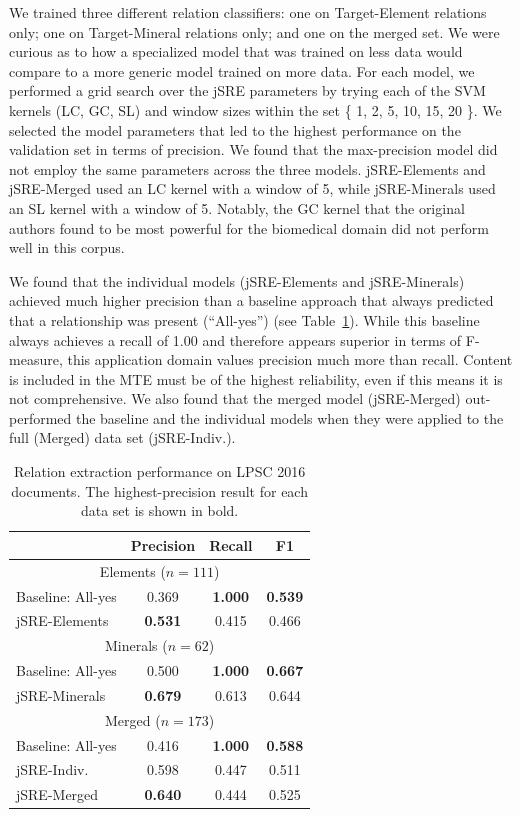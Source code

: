 \documentclass[letterpaper]{article} %
\begin{document}
We trained three different relation classifiers: one on Target-Element
relations only; one on Target-Mineral relations only; and one on the
merged set.  We were curious as to how a specialized model that was
trained on less data would compare to a more generic model trained on
more data.  For each model, we performed a grid search over the jSRE
parameters by trying each of the SVM kernels (LC, GC, SL) and window
sizes within the set \{ 1, 2, 5, 10, 15, 20 \}.  We selected the model
parameters that led to the highest performance on the validation set
in terms of precision.  We found that the max-precision model did not
employ the same parameters across the three models.  jSRE-Elements and
jSRE-Merged used an LC kernel with a window of 5, while jSRE-Minerals
used an SL kernel with a window of 5.  Notably, the GC kernel that the
original authors found to be most powerful for the biomedical domain
did not perform well in this corpus.

We found that the individual models (jSRE-Elements and jSRE-Minerals)
achieved much higher precision than a baseline approach that always
predicted that a relationship was present (``All-yes'') (see
Table~\ref{tab:re}).  While this baseline always achieves a recall of
1.00 and therefore appears superior in terms of F-measure, this
application domain values precision much more than recall.  Content
is included in the MTE must be of the highest reliability, even if
this means it is not comprehensive.  
%
We also found that the merged model (jSRE-Merged) out-performed the
baseline and the individual models when they were applied to the full
(Merged) data set (jSRE-Indiv.). 


\begin{table}
\caption{Relation extraction performance on LPSC 2016 documents. 
The highest-precision result for each data set is shown in bold.}
\label{tab:re}
\begin{center}
\begin{tabular}{l|ccc}
 & Precision & Recall & F1 \\ \hline
\multicolumn{4}{c}{Elements ($n=111$)} \\
Baseline: All-yes & 0.369 & {\bf 1.000} & {\bf 0.539} \\ 
jSRE-Elements & {\bf 0.531} & 0.415 & 0.466 \\ \hline
\multicolumn{4}{c}{Minerals ($n=62$)} \\
Baseline: All-yes & 0.500 & {\bf 1.000} & {\bf 0.667} \\ 
jSRE-Minerals & {\bf 0.679} & 0.613 & 0.644 \\ \hline 
\multicolumn{4}{c}{Merged ($n=173$)} \\
Baseline: All-yes & 0.416 & {\bf 1.000} & {\bf 0.588} \\ 
jSRE-Indiv.  & 0.598 & 0.447 & 0.511 \\
jSRE-Merged  & {\bf 0.640} & 0.444 & 0.525 \\ \hline
\end{tabular}
\end{center}
\end{table}
\end{document}
